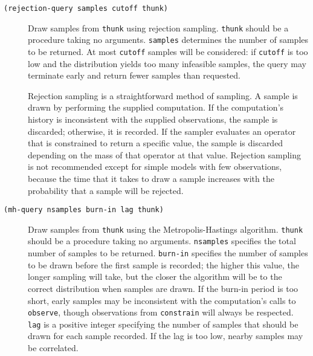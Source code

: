 \documentclass{article}
\begin{document}
\begin{description}
  
\item[\texttt{(rejection-query samples cutoff thunk)}] \hfill
  
  Draw samples from \texttt{thunk} using rejection
  sampling. \texttt{thunk} should be a procedure taking no arguments.
  \texttt{samples} determines the number of samples to be returned. At
  most \texttt{cutoff} samples will be considered: if \texttt{cutoff}
  is too low and the distribution yields too many infeasible samples,
  the query may terminate early and return fewer samples than
  requested.

  Rejection sampling is a straightforward method of sampling. A sample
  is drawn by performing the supplied computation. If the
  computation's history is inconsistent with the supplied
  observations, the sample is discarded; otherwise, it is recorded. If
  the sampler evaluates an operator that is constrained to return a
  specific value, the sample is discarded depending on the mass of
  that operator at that value. Rejection sampling is not recommended
  except for simple models with few observations, because the time
  that it takes to draw a sample increases with the probability that a
  sample will be rejected.

\item[\texttt{(mh-query nsamples burn-in lag thunk)}] \hfill

  Draw samples from \texttt{thunk} using the Metropolis-Hastings
  algorithm. \texttt{thunk} should be a procedure taking no
  arguments. \texttt{nsamples} specifies the total number of samples
  to be returned. \texttt{burn-in} specifies the number of samples to
  be drawn before the first sample is recorded; the higher this value,
  the longer sampling will take, but the closer the algorithm will be
  to the correct distribution when samples are drawn. If the burn-in
  period is too short, early samples may be inconsistent with the
  computation's calls to \texttt{observe}, though observations from
  \texttt{constrain} will always be respected. \texttt{lag} is a
  positive integer specifying the number of samples that should be
  drawn for each sample recorded. If the lag is too low, nearby
  samples may be correlated.


\end{description}
\end{document}
